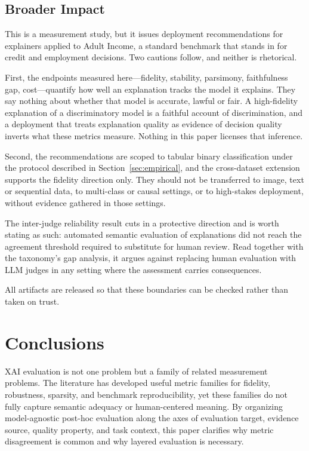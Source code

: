 \documentclass[fleqn,10pt,lineno]{wlpeerj}
\begin{document}
\subsection{Broader Impact}
\label{sec:broader_impact}


This is a measurement study, but it issues deployment recommendations for
explainers applied to Adult Income, a standard benchmark that stands in for
credit and employment decisions. Two cautions follow, and neither is
rhetorical.

First, the endpoints measured here---fidelity, stability, parsimony,
faithfulness gap, cost---quantify how well an explanation tracks the model it
explains. They say nothing about whether that model is accurate, lawful or
fair. A high-fidelity explanation of a discriminatory model is a faithful
account of discrimination, and a deployment that treats explanation quality as
evidence of decision quality inverts what these metrics measure. Nothing in
this paper licenses that inference.

Second, the recommendations are scoped to tabular binary classification under
the protocol described in Section~\ref{sec:empirical}, and the cross-dataset
extension supports the fidelity direction only. They should not be transferred
to image, text or sequential data, to multi-class or causal settings, or to
high-stakes deployment, without evidence gathered in those settings.

The inter-judge reliability result cuts in a protective direction and is worth
stating as such: automated semantic evaluation of explanations did not reach
the agreement threshold required to substitute for human review. Read together
with the taxonomy's gap analysis, it argues against replacing human evaluation
with LLM judges in any setting where the assessment carries consequences.

All artifacts are released so that these boundaries can be checked rather than
taken on trust.

\section{Conclusions}
\label{sec:conclusion}

XAI evaluation is not one problem but a family of related measurement
problems. The literature has developed useful metric families for fidelity,
robustness, sparsity, and benchmark reproducibility, yet these families do
not fully capture semantic adequacy or human-centered meaning. By
organizing model-agnostic post-hoc evaluation along the axes of evaluation
target, evidence source, quality property, and task context, this paper
clarifies why metric disagreement is common and why layered evaluation is
necessary.
\end{document}
